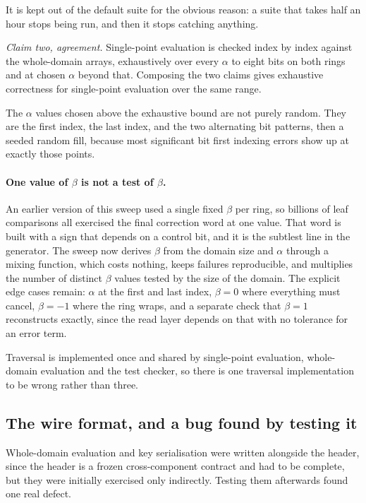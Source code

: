 It is kept out of the default suite for the obvious reason: a suite that takes
half an hour stops being run, and then it stops catching anything.

\emph{Claim two, agreement.} Single-point evaluation is checked index by index
against the whole-domain arrays, exhaustively over every $\alpha$ to eight bits
on both rings and at chosen $\alpha$ beyond that. Composing the two claims
gives exhaustive correctness for single-point evaluation over the same range.

The $\alpha$ values chosen above the exhaustive bound are not purely random.
They are the first index, the last index, and the two alternating bit patterns,
then a seeded random fill, because most significant bit first indexing errors
show up at exactly those points.

\paragraph{One value of $\beta$ is not a test of $\beta$.}
An earlier version of this sweep used a single fixed $\beta$ per ring, so
billions of leaf comparisons all exercised the final correction word at one
value. That word is built with a sign that depends on a control bit, and it is
the subtlest line in the generator. The sweep now derives $\beta$ from the
domain size and $\alpha$ through a mixing function, which costs nothing, keeps
failures reproducible, and multiplies the number of distinct $\beta$ values
tested by the size of the domain. The explicit edge cases remain: $\alpha$ at
the first and last index, $\beta = 0$ where everything must cancel, $\beta = -1$
where the ring wraps, and a separate check that $\beta = 1$ reconstructs
exactly, since the read layer depends on that with no tolerance for an error
term.

Traversal is implemented once and shared by single-point evaluation,
whole-domain evaluation and the test checker, so there is one traversal
implementation to be wrong rather than three.

\subsection{The wire format, and a bug found by testing it}
\label{sec:tech:dpf:serialize}

Whole-domain evaluation and key serialisation were written alongside the
header, since the header is a frozen cross-component contract and had to be
complete, but they were initially exercised only indirectly. Testing them
afterwards found one real defect.

